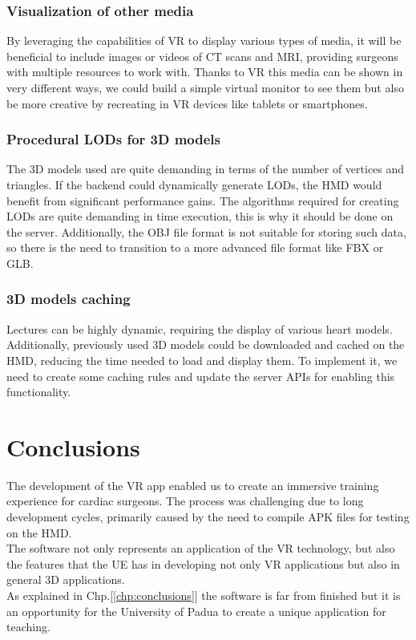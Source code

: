\subsection{Visualization of other media}
\noindent
By leveraging the capabilities of \ac{VR} to display various types of media, it will be beneficial to include images or videos of \ac{CT} scans and \ac{MRI}, providing surgeons with multiple resources to work with.
Thanks to \ac{VR} this media can be shown in very different ways, we could build a simple virtual monitor to see them but also be more creative by recreating in \ac{VR} devices like tablets or smartphones.

\subsection{Procedural LODs for 3D models}
\noindent
The 3D models used are quite demanding in terms of the number of vertices and triangles. If the backend could dynamically generate \ac{LOD}s, the \ac{HMD} would benefit from significant performance gains.
The algorithms required for creating \ac{LOD}s are quite demanding in time execution, this is why it should be done on the server.
Additionally, the OBJ file format is not suitable for storing such data, so there is the need to transition to a more advanced file format like FBX or GLB.

\subsection{3D models caching}
\noindent
Lectures can be highly dynamic, requiring the display of various heart models. Additionally, previously used 3D models could be downloaded and cached on the \ac{HMD}, reducing the time needed to load and display them.
To implement it, we need to create some caching rules and update the server \ac{API}s for enabling this functionality.

\chapter{Conclusions}
\noindent
The development of the \ac{VR} app enabled us to create an immersive training experience for cardiac surgeons.
The process was challenging due to long development cycles, primarily caused by the need to compile \ac{APK} files for testing on the \ac{HMD}.\\
The software not only represents an application of the \ac{VR} technology, but also the features  that the \ac{UE} has in developing not only \ac{VR} applications but also in general 3D applications.\\
As explained in Chp.[\ref{chp:conclusions}] the software is far from finished but it is an opportunity for the University of Padua to create a unique application for teaching.\\